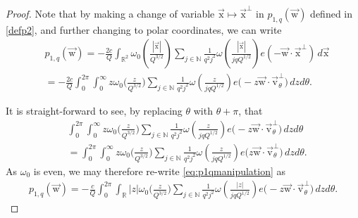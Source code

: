 \documentclass[10pt,a4paper]{amsart}
\newcommand{\NN}{\mathbb{N}}
\newcommand{\R}{\mathbb{R}}
\newcommand{\uv}{{\vec{\mathrm{v}}}}
\newcommand{\uw}{{\vec{\mathrm{w}}}}
\newcommand{\ux}{{\vec{\mathrm{x}}}}
\begin{document}
\begin{proof}
	Note that by making a change of variable $\ux \mapsto \ux^\perp$ in $p_{1, q}(\uw)$ defined in \eqref{defp2}, and further changing to polar coordinates, we can write
    \begin{equation}
    \begin{split}
    &p_{1,q}(\uw)
			=
			-\frac{2c}{Q}
			\int_{\R^2} 
			\omega_0\left(\frac{|\ux|}{Q^{3/2}}\right)
			\sum_{j\in\NN}
			\frac{1}{q^2j^2}
			\omega
			\left(\frac{|\ux|}{jqQ^{1/2}}
			\right)
			e(-\uw\cdot \ux^\perp)
			\,d\ux\\
            &=-\frac{2c}{Q}\int_{0}^{2\pi}\int_{0}^\infty z\omega_0\Big(\frac{z}{Q^{3/2}}\Big) \sum_{j\in\NN}
			\frac{1}{q^2j^2}
			\omega
			\left(\frac{z}{jqQ^{1/2}}
			\right)
			e\Big(-z\uw\cdot \uv_{\theta}^\perp\Big)
			\,dz d\theta.\label{eq:p1qmanipulation}
            \end{split}
            \end{equation}

It is straight-forward to see, by replacing $\theta$ with $\theta+\pi$, that
\begin{align*}
    &\int_{0}^{2\pi}\int_{0}^\infty z\omega_0\Big(\frac{z}{Q^{3/2}}\Big) \sum_{j\in\NN}
			\frac{1}{q^2j^2}
			\omega
			\left(\frac{z}{jqQ^{1/2}}
			\right)
			e\Big(-z\uw\cdot \uv_{\theta}^\perp\Big)
			\,dz d\theta\\&=\int_{0}^{2\pi}\int_{0}^\infty z\omega_0\Big(\frac{z}{Q^{3/2}}\Big) \sum_{j\in\NN}
			\frac{1}{q^2j^2}
			\omega
			\left(\frac{z}{jqQ^{1/2}}
			\right)
			e\Big(z\uw\cdot \uv_{\theta}^\perp\Big)
			\,dz d\theta.
\end{align*}
As $\omega_0$ is even, we may therefore re-write \eqref{eq:p1qmanipulation} as
\begin{align*}p_{1,q}(\uw)
			=-\frac{c}{Q}\int_{0}^{2\pi}\int_{\mathbb R} |z|\omega_0\Big(\frac{z}{Q^{3/2}}\Big) \sum_{j\in\NN}
			\frac{1}{q^2j^2}
			\omega
			\left(\frac{|z|}{jqQ^{1/2}}
			\right)
			e\big(-z\uw\cdot \uv_{\theta}^\perp\big)
			\,dz d\theta.
            \end{align*}


\end{proof}
\end{document}
